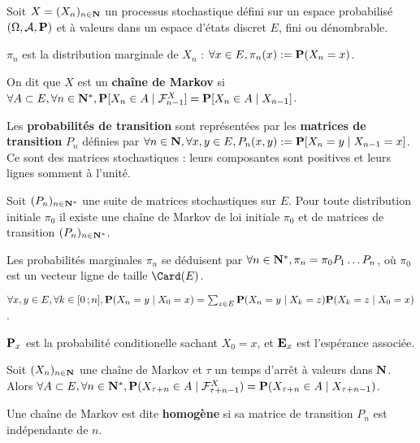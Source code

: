 Soit $X = (X_n)_{n \in \mathbf{N}}$ un processus stochastique défini sur un espace probabilisé $(\Omega,\mathcal{A},\mathbf{P})$ et à valeurs dans un espace d'états discret $E$, fini ou dénombrable.

\begin{note}
	$\pi_n$ est la distribution marginale de $X_n$ : $\forall x \in E, \pi_n(x) := \mathbf{P}(X_n = x)$.
\end{note}

\begin{defn}
	On dit que $X$ est un \textbf{chaîne de Markov} si $\forall A \subset E, \forall n \in \mathbf{N}^*, \mathbf{P}[X_n \in A \mid \mathcal{F}_{n - 1}^X] = \mathbf{P}[X_n \in A \mid X_{n - 1}]$.
\end{defn}

Les \textbf{probabilités de transition} sont représentées par les \textbf{matrices de transition} $P_n$ définies par $\forall n \in \mathbf{N}, \forall x,y \in E, P_n(x,y) := \mathbf{P} [X_n = y \mid X_{n - 1} = x]$.
Ce sont des matrices stochastiques : leurs composantes sont positives et leurs lignes somment à l'unité.

\begin{pop}
	Soit $(P_n)_{n \in \mathbf{N}^*}$ une suite de matrices stochastiques sur $E$.
	Pour toute distribution initiale $\pi_0$ il existe une chaîne de Markov de loi initiale $\pi_0$ et de matrices de transition $(P_n)_{n \in \mathbf{N}^*}$.
\end{pop}

Les probabilités marginales $\pi_n$ se déduisent par $\forall n \in \mathbf{N}^*, \pi_n = \pi_0 P_1 \ldots P_n$, où $\pi_0$ est un vecteur ligne de taille $\Card(E)$.

\begin{pop}
	$\forall x,y \in E, \forall k \in \mathopen{}\mathclose{\left[0\mathclose{}\mathpunct{};n\right]}, \mathbf{P}(X_n = y \mid X_0 = x) = \sum_{z \in E} \mathbf{P}(X_n = y \mid X_k = z) \mathbf{P}(X_k = z \mid X_0 = x)$.
\end{pop}

\begin{note}
	$\mathbf{P}_x$ est la probabilité conditionelle sachant $X_0 = x$, et $\mathbf{E}_x$ est l'espérance associée.
\end{note}

\begin{thm}
	Soit $(X_n)_{n \in \mathbf{N}}$ une chaîne de Markov et $\tau$ un temps d'arrêt à valeurs dans $\mathbf{N}$.
	Alors $\forall A \subset E, \forall n \in \mathbf{N}^*, \mathbf{P}(X_{\tau + n} \in A \mid \mathcal{F}_{\tau + n - 1}^X) = \mathbf{P}(X_{\tau + n} \in A \mid X_{\tau + n - 1})$.
\end{thm}

\begin{defn}
	Une chaîne de Markov est dite \textbf{homogène} si sa matrice de transition $P_n$ est indépendante de $n$.
\end{defn}
